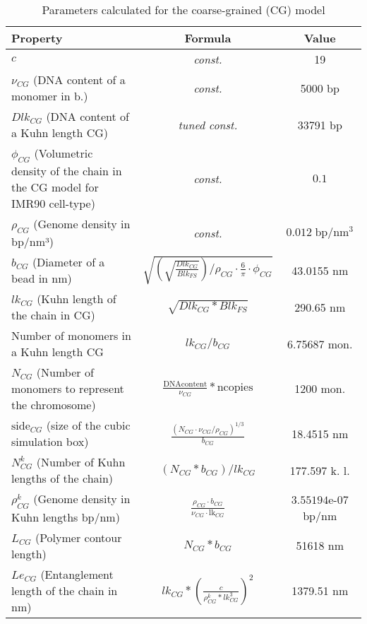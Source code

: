 \begin{itemize}
    
    \begin{table}[H]
        \begin{tabular}{|l|c|c|}
            \hline
            \textbf{Property} & \textbf{Formula} & \textbf{Value}\\
    \hline
    \textbf{$c$} & \textit{const.} & 19\\
    \hline
    $\nu_{CG}$ (DNA content of a monomer in b.) & \textit{const.} & 5000 bp\\
    \hline
    $Dlk_{CG}$ (DNA content of a Kuhn length CG) & \textit{tuned const.} & 33791 bp\\
    \hline
    $\phi_{CG}$ (Volumetric density of the chain in the CG model for IMR90 cell-type) & \textit{const.} & $0.1$ \\ %
    \hline
    \textbf{$\rho_{CG}$} (Genome density in bp/nm³) & \textit{const.} & $0.012\; \text{bp}/\text{nm}^3$\\
    \hline
    $b_{CG}$ (Diameter of a bead in nm) & $\sqrt{\left(\sqrt{\frac{{Dlk_{CG}}}{{Blk_{FS}}}}\right) / \rho_{CG} \cdot \frac{6}{\pi} \cdot \phi_{CG}}
    $ & 43.0155 nm\\
    \hline
    \textbf{$lk_{CG}$} (Kuhn length of the chain  in CG) & $\sqrt{Dlk_{CG} * Blk_{FS}}$ & 290.65 nm \\
    \hline
    Number of monomers in a Kuhn length CG & $lk_{CG}/b_{CG}$ & 6.75687 mon.\\
    \hline
    \textbf{$N_{CG}$} (Number of monomers to represent the chromosome) & $\frac{\text{DNAcontent}}{\nu_{CG}} * \text{ncopies}$& 1200 mon.\\
    \hline
    $\text{side}_{CG}$ (size of the cubic simulation box) & $\frac{{(N_{CG} \cdot \nu_{CG} / \rho_{CG})^{1/3}}}{{b_{CG}}}
    $ & 18.4515 nm\\
    \hline
    \textbf{$N^k_{CG}$} (Number of Kuhn lengths of the chain) & $(N_{CG} * b_{CG})/{lk_{CG}}$ & 177.597 k. l.\\
    \hline
    \textbf{$\rho^k_{CG}$} (Genome density in Kuhn lengths bp/nm) & $\frac{\rho_{CG} \cdot b_{CG}}{\nu_{CG} \cdot \text{lk}_{CG}}$ & $3.55194$e-07 bp/nm \\
    \hline
    
    \textbf{$L_{CG}$} (Polymer contour length) & $N_{CG} * b_{CG}$& 51618 nm\\
    \hline
    \textbf{$Le_{CG}$} (Entanglement length of the chain in nm) & $lk_{CG} * \left(\frac{c}{\rho^k_{CG} * lk_{CG}^3}\right)^2$ & 1379.51 nm\\
    \hline
    \end{tabular}
    \label{tab: parameters CG}
    \caption{Parameters calculated for the coarse-grained (CG) model}
    \end{table}
    

\end{itemize}
